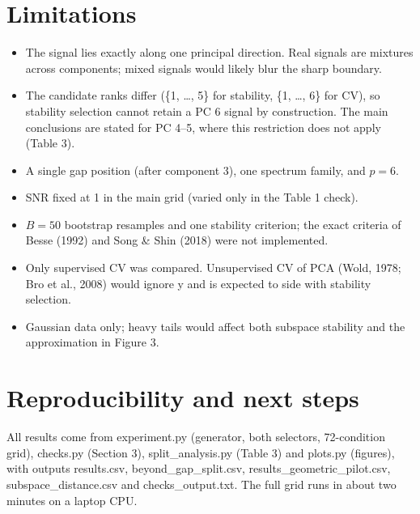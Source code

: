 \documentclass[11pt]{article}
\begin{document}
\section{Limitations}

\begin{itemize}

\item The signal lies exactly along one principal direction. Real signals are mixtures across components; mixed signals would likely blur the sharp boundary.

\item The candidate ranks differ (\{1, \ldots{}, 5\} for stability, \{1, \ldots{}, 6\} for CV), so stability selection cannot retain a PC 6 signal by construction. The main conclusions are stated for PC 4--5, where this restriction does not apply (Table 3).

\item A single gap position (after component 3), one spectrum family, and $p=6$.

\item SNR fixed at 1 in the main grid (varied only in the Table 1 check).

\item $B=50$ bootstrap resamples and one stability criterion; the exact criteria of Besse (1992) and Song \& Shin (2018) were not implemented.

\item Only supervised CV was compared. Unsupervised CV of PCA (Wold, 1978; Bro et al., 2008) would ignore y and is expected to side with stability selection.

\item Gaussian data only; heavy tails would affect both subspace stability and the approximation in Figure 3.

\end{itemize}

\section{Reproducibility and next steps}

All results come from experiment.py (generator, both selectors, 72-condition grid), checks.py (Section 3), split\_analysis.py (Table 3) and plots.py (figures), with outputs results.csv, beyond\_gap\_split.csv, results\_geometric\_pilot.csv, subspace\_distance.csv and checks\_output.txt. The full grid runs in about two minutes on a laptop CPU.\par
\end{document}
